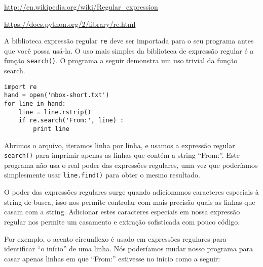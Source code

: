\url{http://en.wikipedia.org/wiki/Regular_expression}

\url{https://docs.python.org/2/library/re.html}

A biblioteca expressão regular {\tt re} deve ser importada para o seu programa antes que você 
possa usá-la. O uso mais simples da biblioteca de expressão regular é a função {\tt search()}. 
O programa a seguir demonstra um uso trivial da função search.


\beforeverb
\begin{verbatim}
import re
hand = open('mbox-short.txt')
for line in hand:
    line = line.rstrip()
    if re.search('From:', line) :
        print line
\end{verbatim}
\afterverb
%

Abrimos o arquivo, iteramos linha por linha, e usamos a expressão regular {\tt search()} para
imprimir apenas as linhas que contém a string ``From:''. Este programa não usa o real poder 
das expressões regulares, uma vez que poderíamos simplesmente usar {\tt line.find()} para
obter o mesmo resultado.



O poder das expressões regulares surge quando adicionamos caracteres especiais à string de busca, 
isso nos permite controlar com mais precisão quais as linhas que casam com a string. 
Adicionar estes caracteres especiais em nossa expressão regular nos permite um casamento e 
extração sofisticada com pouco código.

Por exemplo, o acento circunflexo é usado em expressões 
regulares para identificar ``o início'' de uma linha.
Nós poderíamos mudar nosso programa para casar apenas
linhas em que ``From:'' estivesse no início como a seguir:

